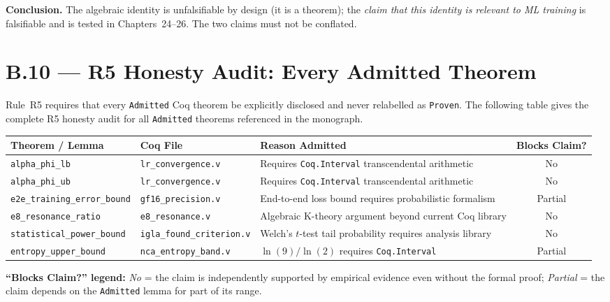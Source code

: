 \noindent\textbf{Conclusion.}  The algebraic identity is unfalsifiable by design
(it is a theorem); the \emph{claim that this identity is relevant to ML
training} is falsifiable and is tested in Chapters~24--26.  The two claims
must not be conflated.

\section*{B.10 — R5 Honesty Audit: Every Admitted Theorem}
\label{sec:r5-audit}

\noindent Rule~R5 requires that every \texttt{Admitted} Coq theorem be
explicitly disclosed and never relabelled as \texttt{Proven}.  The following
table gives the complete R5 honesty audit for all \texttt{Admitted} theorems
referenced in the monograph.

\begin{center}
\begin{tabular}{p{3.5cm}p{4cm}p{4cm}c}
\hline
\textbf{Theorem / Lemma} & \textbf{Coq File} & \textbf{Reason Admitted} &
\textbf{Blocks Claim?} \\
\hline
\texttt{alpha\_phi\_lb} & \texttt{lr\_convergence.v} &
  Requires \texttt{Coq.Interval} transcendental arithmetic & No \\
\texttt{alpha\_phi\_ub} & \texttt{lr\_convergence.v} &
  Requires \texttt{Coq.Interval} transcendental arithmetic & No \\
\texttt{e2e\_training\_error\_bound} & \texttt{gf16\_precision.v} &
  End-to-end loss bound requires probabilistic formalism & Partial \\
\texttt{e8\_resonance\_ratio} & \texttt{e8\_resonance.v} &
  Algebraic K-theory argument beyond current Coq library & No \\
\texttt{statistical\_power\_bound} & \texttt{igla\_found\_criterion.v} &
  Welch's $t$-test tail probability requires analysis library & No \\
\texttt{entropy\_upper\_bound} & \texttt{nca\_entropy\_band.v} &
  $\ln(9)/\ln(2)$ requires \texttt{Coq.Interval} & Partial \\
\hline
\end{tabular}
\end{center}

\noindent \textbf{``Blocks Claim?'' legend:}
\emph{No} = the claim is independently supported by empirical evidence even
without the formal proof; \emph{Partial} = the claim depends on the
\texttt{Admitted} lemma for part of its range.


